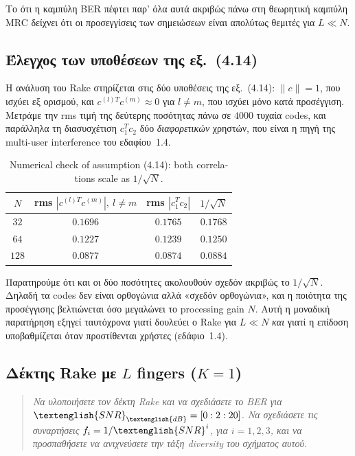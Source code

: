 \documentclass[11pt,a4paper]{article}
\newenvironment{zit}%
  {\begin{quote}\itshape}%
  {\end{quote}\noindent}
\newcommand{\en}[1]{\textenglish{#1}}
\newcommand{\SNR}{\en{SNR}}
\newcommand{\BER}{\en{BER}}
\newcommand{\MRC}{\en{MRC}}
\newcommand{\Rake}{\en{Rake}}
\begin{document}
Το ότι η καμπύλη \BER{} πέφτει παρ' όλα αυτά ακριβώς πάνω στη θεωρητική καμπύλη \MRC{}
δείχνει ότι οι προσεγγίσεις των σημειώσεων είναι απολύτως θεμιτές για $L \ll N$.

\subsection{Έλεγχος των υποθέσεων της εξ.~(4.14)}\label{sec:orth}

Η ανάλυση του \Rake{} στηρίζεται στις δύο υποθέσεις της εξ.~(4.14): $\|c\|=1$, που ισχύει
εξ ορισμού, και $c^{(l)T}c^{(m)} \approx 0$ για $l \neq m$, που ισχύει μόνο κατά προσέγγιση.
Μετράμε την \en{rms} τιμή της δεύτερης ποσότητας πάνω σε $4000$ τυχαία \en{codes}, και
παράλληλα τη διασυσχέτιση $c_1^{T}c_2$ δύο \emph{διαφορετικών} χρηστών, που είναι η πηγή της
\en{multi-user interference} του εδαφίου~1.4.

\begin{table}[H]
  \centering\small
  \begin{tabular}{cccc}
    \toprule
    $N$ & \en{rms} $|c^{(l)T}c^{(m)}|,\ l \neq m$ & \en{rms} $|c_1^{T}c_2|$ & $1/\sqrt{N}$ \\
    \midrule
    $32$  & $0.1696$ & $0.1765$ & $0.1768$ \\
    $64$  & $0.1227$ & $0.1239$ & $0.1250$ \\
    $128$ & $0.0877$ & $0.0874$ & $0.0884$ \\
    \bottomrule
  \end{tabular}
  \caption{\en{Numerical check of assumption (4.14): both correlations scale as
  $1/\sqrt{N}$.}}\label{tab:orth}
\end{table}

Παρατηρούμε ότι και οι δύο ποσότητες ακολουθούν σχεδόν ακριβώς το $1/\sqrt{N}$. Δηλαδή τα
\en{codes} δεν είναι ορθογώνια αλλά «σχεδόν ορθογώνια», και η ποιότητα της προσέγγισης
βελτιώνεται όσο μεγαλώνει το \en{processing gain} $N$. Αυτή η μοναδική παρατήρηση εξηγεί
ταυτόχρονα γιατί δουλεύει ο \Rake{} για $L \ll N$ \emph{και} γιατί η επίδοση υποβαθμίζεται
όταν προστίθενται χρήστες (εδάφιο~1.4).

\subsection{Δέκτης \Rake{} με $L$ \en{fingers} ($K=1$)}

\begin{zit}
Να υλοποιήσετε τον δέκτη \en{Rake} και να σχεδιάσετε το \BER{} για
$\SNR_{\en{dB}} = [0:2:20]$. Να σχεδιάσετε τις συναρτήσεις $f_i = 1/\SNR^i$, για
$i=1,2,3$, και να προσπαθήσετε να ανιχνεύσετε την τάξη \en{diversity} του σχήματος αυτού.
\end{zit}
\end{document}
